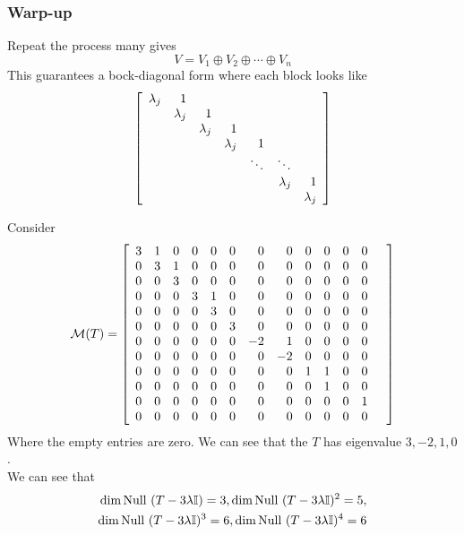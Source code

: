 \subsubsection*{Warp-up}
Repeat the process many gives 
\[V = V_1 \oplus V_2 \oplus \cdots \oplus V_n \]
This guarantees a bock-diagonal form where each block looks like 
\[ \left[ \begin{array}{rrrrrrrrrrrrrrrrr} 
\lambda_j & 1 \\	
& \lambda_j & 1 \\
&& \lambda_j & 1 \\
&&& \lambda_j & 1 \\
&&&& \ddots & \ddots \\
&&&&& \lambda_j & 1 \\
&&&&&& \lambda_j
\end{array} \right]\]


\begin{example}
	Consider
	\[ \mathcal M(T) =  \left[ \begin{array}{rrrrrrrrrrrrrrrrr} 
			3 & 1 & 0 & 0 & 0 & 0 & 0 & 0 & 0 & 0 & 0 & 0\\
			0 & 3 & 1 & 0 & 0 & 0 & 0 & 0 & 0 & 0 & 0 & 0\\
			0 & 0 & 3 & 0 & 0 & 0 & 0 & 0 & 0 & 0 & 0 & 0\\
			0 & 0 & 0 & 3 & 1 & 0 & 0 & 0 & 0 & 0 & 0 & 0\\
			0 & 0 & 0 & 0 & 3 & 0 & 0 & 0 & 0 & 0 & 0 & 0\\
			0 & 0 & 0 & 0 & 0 & 3 & 0 & 0 & 0 & 0 & 0 & 0  \\
			0 & 0 & 0 & 0 & 0 & 0 & -2 & 1 & 0 & 0 & 0 & 0 \\
			0 & 0 & 0 & 0 & 0 & 0 & 0 & -2 & 0 & 0 & 0 & 0 & \\
			0 & 0 & 0 & 0 & 0 & 0 & 0 & 0 & 1 & 1 & 0 & 0\\
			0 & 0 & 0 & 0 & 0 & 0 & 0 & 0 & 0 & 1 & 0 & 0\\
			0 & 0 & 0 & 0 & 0 & 0 & 0 & 0 & 0 & 0 & 0 & 1 \\
			0 & 0 & 0 & 0 & 0 & 0 & 0 & 0 & 0 & 0 & 0 & 0 \end{array} \right]\]
Where the empty entries are zero. We can see that the $T$ has eigenvalue $3,-2,1,0$. \\
We can see that \begin{align*} \dim \text{Null } (T - 3\lambda \mathbb I) = 3, \dim \text{Null } (T - 3\lambda \mathbb I)^2 = 5, \\ \dim \text{Null } (T - 3\lambda \mathbb I)^3 = 6, \dim \text{Null } (T - 3\lambda \mathbb I)^4 = 6
\end{align*}
\end{example}



